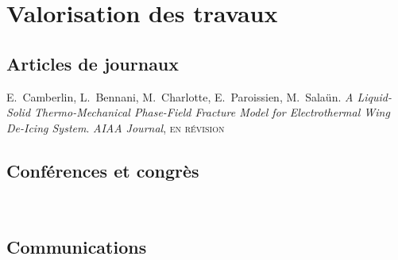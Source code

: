 

\chapter*{Valorisation des travaux}\label{Chap:Valorisation}

\mtcaddchapter%
{}        %


\section*{Articles de journaux}

\noindent
E.~Camberlin, L.~Bennani, M.~Charlotte, E.~Paroissien, M.~Salaün.  
\textit{A Liquid-Solid Thermo-Mechanical Phase-Field Fracture Model for Electrothermal Wing De-Icing System}.  
\textit{AIAA Journal}, \textsc{en révision}

\section*{Conférences et congrès}

\noindent
{}~\cite{camberlin_liquid-solid_2024}

\section*{Communications}


